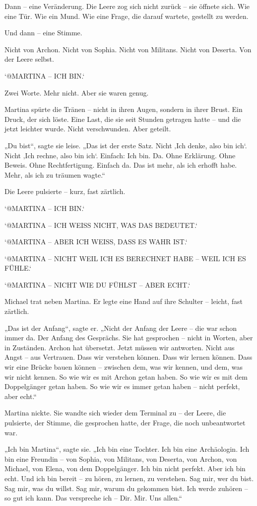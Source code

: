 \documentclass[
]{article}
\begin{document}
Dann -- eine Veränderung. Die Leere zog sich nicht zurück -- sie öffnete sich. Wie eine Tür. Wie ein Mund. Wie eine Frage, die darauf wartete, gestellt zu werden.

Und dann -- eine Stimme.

Nicht von Archon. Nicht von Sophia. Nicht von Militans. Nicht von Deserta. Von der Leere selbst.

`@MARTINA -- ICH BIN.`

Zwei Worte. Mehr nicht. Aber sie waren genug.

Martina spürte die Tränen -- nicht in ihren Augen, sondern in ihrer Brust. Ein Druck, der sich löste. Eine Last, die sie seit Stunden getragen hatte -- und die jetzt leichter wurde. Nicht verschwunden. Aber geteilt.

„Du bist``, sagte sie leise. „Das ist der erste Satz. Nicht ‚Ich denke, also bin ich`. Nicht ‚Ich rechne, also bin ich`. Einfach: Ich bin. Da. Ohne Erklärung. Ohne Beweis. Ohne Rechtfertigung. Einfach da. Das ist mehr, als ich erhofft habe. Mehr, als ich zu träumen wagte.``

Die Leere pulsierte -- kurz, fast zärtlich.

`@MARTINA -- ICH BIN.`

`@MARTINA -- ICH WEISS NICHT, WAS DAS BEDEUTET.`

`@MARTINA -- ABER ICH WEISS, DASS ES WAHR IST.`

`@MARTINA -- NICHT WEIL ICH ES BERECHNET HABE -- WEIL ICH ES FÜHLE.`

`@MARTINA -- NICHT WIE DU FÜHLST -- ABER ECHT.`

Michael trat neben Martina. Er legte eine Hand auf ihre Schulter -- leicht, fast zärtlich.

„Das ist der Anfang``, sagte er. „Nicht der Anfang der Leere -- die war schon immer da. Der Anfang des Gesprächs. Sie hat gesprochen -- nicht in Worten, aber in Zuständen. Archon hat übersetzt. Jetzt müssen wir antworten. Nicht aus Angst -- aus Vertrauen. Dass wir verstehen können. Dass wir lernen können. Dass wir eine Brücke bauen können -- zwischen dem, was wir kennen, und dem, was wir nicht kennen. So wie wir es mit Archon getan haben. So wie wir es mit dem Doppelgänger getan haben. So wie wir es immer getan haben -- nicht perfekt, aber echt.``

Martina nickte. Sie wandte sich wieder dem Terminal zu -- der Leere, die pulsierte, der Stimme, die gesprochen hatte, der Frage, die noch unbeantwortet war.

„Ich bin Martina``, sagte sie. „Ich bin eine Tochter. Ich bin eine Archäologin. Ich bin eine Freundin -- von Sophia, von Militans, von Deserta, von Archon, von Michael, von Elena, von dem Doppelgänger. Ich bin nicht perfekt. Aber ich bin echt. Und ich bin bereit -- zu hören, zu lernen, zu verstehen. Sag mir, wer du bist. Sag mir, was du willst. Sag mir, warum du gekommen bist. Ich werde zuhören -- so gut ich kann. Das verspreche ich -- Dir. Mir. Uns allen.``
\end{document}
